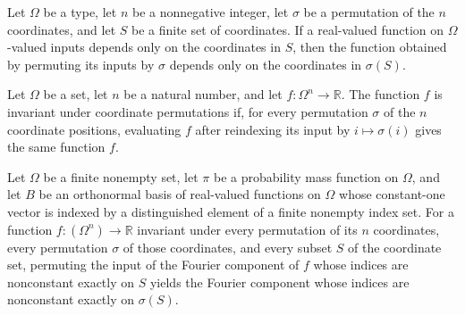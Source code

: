 \begin{theorem}
\label{FABL.permuteProductFunction_dependsOnly}
\leanok
{}
Let $\Omega$ be a type, let $n$ be a nonnegative integer, let $\sigma$ be a permutation of the
$n$ coordinates, and let $S$ be a finite set of coordinates. If a real-valued function
on $\Omega$-valued inputs depends only on the coordinates in $S$, then the function
obtained by permuting its inputs by $\sigma$ depends only on the coordinates in $\sigma(S)$.
\end{theorem}

\begin{definition}
\label{FABL.IsProductSymmetric}
\leanok
{}
Let $\Omega$ be a set, let $n$ be a natural number, and let $f\colon\Omega^n\to\mathbb
R$. The function $f$ is invariant under coordinate permutations if, for every
permutation $\sigma$ of the $n$ coordinate positions, evaluating $f$ after reindexing
its input by $i\mapsto\sigma(i)$ gives the same function $f$.
\end{definition}

\begin{theorem}
\label{FABL.FiniteFourierBasis.permuteProductFunction_orthogonalComponent_of_symmetric}
\leanok
{}
Let $\Omega$ be a finite nonempty set, let $\pi$ be a probability mass function on
$\Omega$, and let $B$ be an orthonormal basis of real-valued functions on $\Omega$ whose
constant-one vector is indexed by a distinguished element of a finite nonempty index
set. For a function $f:(\Omega^n)\to\mathbb R$ invariant under every permutation of its
$n$ coordinates, every permutation $\sigma$ of those coordinates, and every subset $S$
of the coordinate set, permuting the input of the Fourier component of $f$ whose indices
are nonconstant exactly on $S$ yields the Fourier component whose indices are
nonconstant exactly on $\sigma(S)$.
\end{theorem}

